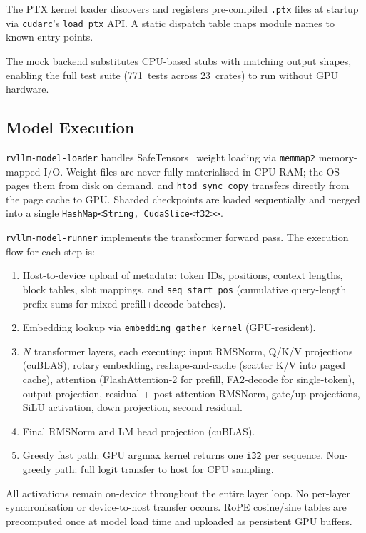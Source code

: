\documentclass[11pt,a4paper]{article}
\begin{document}
The PTX kernel loader discovers and registers pre-compiled \texttt{.ptx} files at
startup via \texttt{cudarc}'s \texttt{load\_ptx} API. A static dispatch table maps
module names to known entry points.

The mock backend substitutes CPU-based stubs with matching output shapes, enabling
the full test suite (771~tests across 23~crates) to run without GPU hardware.

\subsection{Model Execution}

\texttt{rvllm-model-loader} handles SafeTensors~\cite{safetensors2023} weight loading
via \texttt{memmap2} memory-mapped I/O. Weight files are never fully materialised in
CPU RAM; the OS pages them from disk on demand, and \texttt{htod\_sync\_copy}
transfers directly from the page cache to GPU. Sharded checkpoints are loaded
sequentially and merged into a single \texttt{HashMap<String, CudaSlice<f32>{}>}.

\texttt{rvllm-model-runner} implements the transformer forward pass. The execution
flow for each step is:
\begin{enumerate}
  \item Host-to-device upload of metadata: token IDs, positions, context lengths,
        block tables, slot mappings, and \texttt{seq\_start\_pos} (cumulative
        query-length prefix sums for mixed prefill+decode batches).
  \item Embedding lookup via \texttt{embedding\_gather\_kernel} (GPU-resident).
  \item $N$ transformer layers, each executing: input RMSNorm, Q/K/V projections
        (cuBLAS), rotary embedding, reshape-and-cache (scatter K/V into paged cache),
        attention (FlashAttention-2 for prefill, FA2-decode for single-token), output
        projection, residual + post-attention RMSNorm, gate/up projections,
        SiLU activation, down projection, second residual.
  \item Final RMSNorm and LM head projection (cuBLAS).
  \item Greedy fast path: GPU argmax kernel returns one \texttt{i32} per sequence.
        Non-greedy path: full logit transfer to host for CPU sampling.
\end{enumerate}

All activations remain on-device throughout the entire layer loop. No per-layer
synchronisation or device-to-host transfer occurs. RoPE cosine/sine tables are
precomputed once at model load time and uploaded as persistent GPU buffers.
\end{document}

